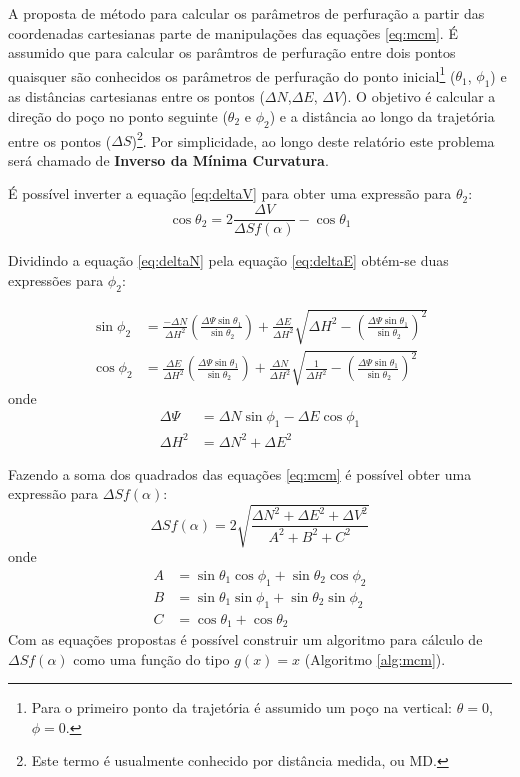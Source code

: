 \documentclass[final,5p]{elsarticle}
\numberwithin{equation}{section}
\begin{document}
A proposta de método para calcular os parâmetros de perfuração a partir das coordenadas cartesianas parte de manipulações das equações \ref{eq:mcm}. É assumido que para calcular os parâmtros de perfuração entre dois pontos quaisquer são conhecidos os parâmetros de perfuração do ponto inicial\footnote{Para o primeiro ponto da trajetória é assumido um poço na vertical: $\theta=0$, $\phi=0$.} ($\theta_1$, $\phi_1$) e as distâncias cartesianas entre os pontos ($\Delta N$,$\Delta E$, $\Delta V$). O objetivo é calcular a direção do poço no ponto seguinte ($\theta_2$ e $\phi_2$) e a distância ao longo da trajetória entre os pontos ($\Delta S$)\footnote{Este termo é usualmente conhecido por distância medida, ou MD.}. Por simplicidade, ao longo deste relatório este problema será chamado de \textbf{Inverso da Mínima Curvatura}.

É possível inverter a equação \ref{eq:deltaV} para obter uma expressão para $\theta_2$:
\begin{equation} \label{eq:cos_theta2}
    \cos \theta_2 = 2 \frac{\Delta V}{\Delta S f(\alpha)} - \cos \theta_1 
\end{equation}

Dividindo a equação \ref{eq:deltaN} pela equação \ref{eq:deltaE} obtém-se duas expressões para $\phi_2$:

\begin{subequations}\label{eq:phi2}
    \begin{align}  
    \sin \phi_2 &= \frac{-\Delta N}{\Delta H^2} \left( \frac{\Delta \Psi \sin \theta_1}{\sin \theta_2} \right) + \frac{\Delta E}{\Delta H^2} \sqrt{\Delta H^2 - \left( \frac{\Delta \Psi \sin \theta_1}{\sin \theta_2} \right)^2} \label{eq:sin_phi2} \\
    \cos \phi_2 &= \frac{\Delta E}{\Delta H^2} \left( \frac{\Delta \Psi \sin \theta_1}{\sin \theta_2} \right) + \frac{\Delta N}{\Delta H^2} \sqrt{\frac{1}{\Delta H^2} - \left( \frac{\Delta \Psi \sin \theta_1}{\sin \theta_2} \right)^2} \label{eq:cos_phi2}
    \end{align}
\end{subequations}
onde
\begin{align*}
    \Delta \Psi &= \Delta N \sin \phi_1 - \Delta E \cos \phi_1 \\
    \Delta H^2 &= \Delta N^2 + \Delta E^2
\end{align*}

Fazendo a soma dos quadrados das equações \ref{eq:mcm} é possível obter uma expressão para $\Delta S f(\alpha)$:
\begin{equation} \label{eq:DeltaSfa}
    \Delta S f(\alpha) = 2 \sqrt{\frac{\Delta N^2 + \Delta E^2 + \Delta V^2}{A^2+B^2+C^2}}
\end{equation}
onde
\begin{align*}
    A &= \sin \theta_1 \cos \phi_1 + \sin \theta_2 \cos \phi_2 \\
    B &= \sin \theta_1 \sin \phi_1 + \sin \theta_2 \sin \phi_2 \\
    C &= \cos \theta_1 + \cos \theta_2
\end{align*}
Com as equações propostas é possível construir um algoritmo para cálculo de $\Delta S f(\alpha)$ como uma função do tipo $g(x)=x$ (Algoritmo \ref{alg:mcm}).
\end{document}
